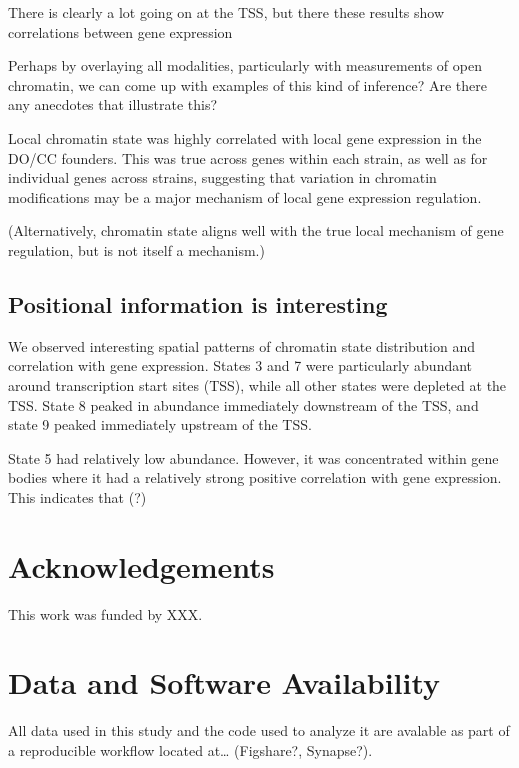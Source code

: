 \documentclass[10pt,letterpaper]{article}
\begin{document}
There is clearly a lot going on at the TSS, but there these results show
correlations between gene expression

Perhaps by overlaying all modalities, particularly with measurements of
open chromatin, we can come up with examples of this kind of inference?
Are there any anecdotes that illustrate this?

Local chromatin state was highly correlated with local gene expression
in the DO/CC founders. This was true across genes within each strain, as
well as for individual genes across strains, suggesting that variation
in chromatin modifications may be a major mechanism of local gene
expression regulation.

(Alternatively, chromatin state aligns well with the true local
mechanism of gene regulation, but is not itself a mechanism.)

\hypertarget{positional-information-is-interesting}{%
\subsection{Positional information is
interesting}\label{positional-information-is-interesting}}

We observed interesting spatial patterns of chromatin state distribution
and correlation with gene expression. States 3 and 7 were particularly
abundant around transcription start sites (TSS), while all other states
were depleted at the TSS. State 8 peaked in abundance immediately
downstream of the TSS, and state 9 peaked immediately upstream of the
TSS.

State 5 had relatively low abundance. However, it was concentrated
within gene bodies where it had a relatively strong positive correlation
with gene expression. This indicates that (?)

\hypertarget{acknowledgements}{%
\section{Acknowledgements}\label{acknowledgements}}

This work was funded by XXX.

\hypertarget{data-and-software-availability}{%
\section{Data and Software
Availability}\label{data-and-software-availability}}

All data used in this study and the code used to analyze it are avalable
as part of a reproducible workflow located at\ldots{} (Figshare?,
Synapse?).
\end{document}
